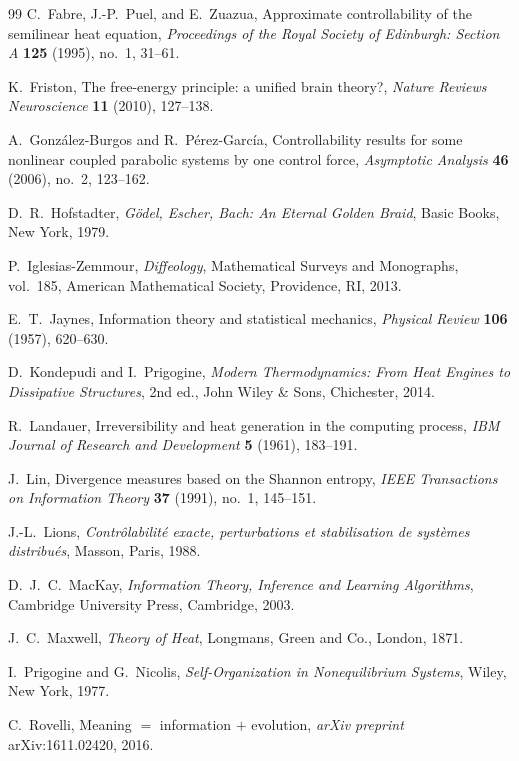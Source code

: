 \documentclass[12pt, oneside]{memoir}
\begin{document}
\begin{thebibliography}{99}
C.~Fabre, J.-P.~Puel, and E.~Zuazua,
Approximate controllability of the semilinear heat equation,
\textit{Proceedings of the Royal Society of Edinburgh: Section A} \textbf{125} (1995),
no.~1, 31--61.

K.~Friston,
The free-energy principle: a unified brain theory?,
\textit{Nature Reviews Neuroscience} \textbf{11} (2010), 127--138.

A.~González-Burgos and R.~Pérez-García,
Controllability results for some nonlinear coupled parabolic systems by one control force,
\textit{Asymptotic Analysis} \textbf{46} (2006), no.~2, 123--162.

D.~R.~Hofstadter,
\textit{Gödel, Escher, Bach: An Eternal Golden Braid},
Basic Books, New York, 1979.

P.~Iglesias-Zemmour,
\textit{Diffeology},
Mathematical Surveys and Monographs, vol.~185,
American Mathematical Society, Providence, RI, 2013.

E.~T.~Jaynes,
Information theory and statistical mechanics,
\textit{Physical Review} \textbf{106} (1957), 620--630.

D.~Kondepudi and I.~Prigogine,
\textit{Modern Thermodynamics: From Heat Engines to Dissipative Structures},
2nd ed., John Wiley \& Sons, Chichester, 2014.

R.~Landauer,
Irreversibility and heat generation in the computing process,
\textit{IBM Journal of Research and Development} \textbf{5} (1961), 183--191.

J.~Lin,
Divergence measures based on the Shannon entropy,
\textit{IEEE Transactions on Information Theory} \textbf{37} (1991), no.~1, 145--151.

J.-L.~Lions,
\textit{Contrôlabilité exacte, perturbations et stabilisation de systèmes distribués},
Masson, Paris, 1988.

D.~J.~C.~MacKay,
\textit{Information Theory, Inference and Learning Algorithms},
Cambridge University Press, Cambridge, 2003.

J.~C.~Maxwell,
\textit{Theory of Heat},
Longmans, Green and Co., London, 1871.

I.~Prigogine and G.~Nicolis,
\textit{Self-Organization in Nonequilibrium Systems},
Wiley, New York, 1977.

C.~Rovelli,
Meaning $=$ information $+$ evolution,
\textit{arXiv preprint} arXiv:1611.02420, 2016.


\end{thebibliography}
\end{document}
